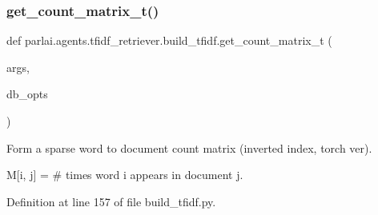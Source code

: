 \mbox{\label{namespaceparlai_1_1agents_1_1tfidf__retriever_1_1build__tfidf_ac277ce99c037a483df09e82cfdbe4665}} 
\subsubsection{\texorpdfstring{get\+\_\+count\+\_\+matrix\+\_\+t()}{get\_count\_matrix\_t()}}
{\footnotesize\ttfamily def parlai.\+agents.\+tfidf\+\_\+retriever.\+build\+\_\+tfidf.\+get\+\_\+count\+\_\+matrix\+\_\+t (\begin{DoxyParamCaption}\item[{}]{args,  }\item[{}]{db\+\_\+opts }\end{DoxyParamCaption})}

\begin{DoxyVerb}Form a sparse word to document count matrix (inverted index, torch ver).

M[i, j] = # times word i appears in document j.
\end{DoxyVerb}
 

Definition at line 157 of file build\+\_\+tfidf.\+py.


